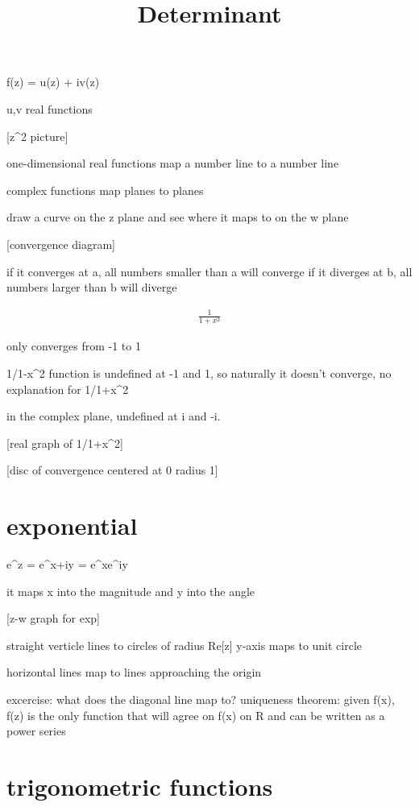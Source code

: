 \documentclass{article}
\title{Determinant}
\date{}
\begin{document}
\maketitle

f(z) = u(z) + iv(z)

u,v real functions

[z^2 picture]

one-dimensional real functions map a number line to a number line

complex functions map planes to planes

draw a curve on the z plane and see where it maps to on the w plane

[convergence diagram]

if it converges at a, all numbers smaller than a will converge
if it diverges at b, all numbers larger than b will diverge

\begin{align}
\frac{1}{1+x^2}
\end{align}

only converges from -1 to 1

1/1-x^2 function is undefined at -1 and 1, so naturally it doesn't converge, no explanation for 1/1+x^2

in the complex plane, undefined at i and -i.

[real graph of 1/1+x^2]

[disc of convergence centered at 0 radius 1]

\section{exponential}

e^z = e^x+iy = e^xe^iy

it maps x into the magnitude and y into the angle

[z-w graph for exp]

straight verticle lines to circles of radius Re[z]
y-axis maps to unit circle

horizontal lines map to lines approaching the origin

excercise: what does
 the diagonal line map to?
uniqueness theorem: given f(x), f(z) is the only function that will agree on f(x) on R and can be written as a power series

\section{trigonometric functions}
\end{document}
